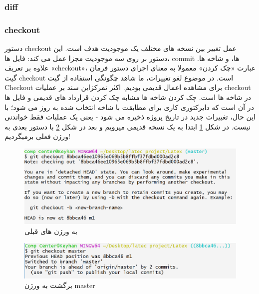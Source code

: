 \subsubsection{diff}
\subsubsection{checkout}
دستور checkout عمل تغییر بین نسخه های مختلف یک موجودیت هدف است. این دستور بر روی سه موجودیت مجزا عمل می کند: فایل ها، commit ها، و شاخه ها. علاوه بر تعریف «checkout»، عبارت «چک کردن» معمولا به معنای اجرای دستور فرمان گیت checkout است. در موضوع لغو تغییرات، ما شاهد چگونگی استفاده از گیت  Checkout برای مشاهده اعمال قدیمی بودیم. اکثر تمرکزاین سند بر عملیات checkout در شاخه ها است.
\newline
چک کردن شاخه ها مشابه چک کردن قرارداد های قدیمی و فایل ها در آن است که دایرکتوری کاری برای مطابقت با شاخه انتخاب شده به روز می شود؛ با این حال، تغییرات جدید در تاریخ پروژه ذخیره می شود - یعنی یک عملیات فقط خواندنی نیست. \newline
در شکل \ref{Fig:GitCheckout} ابتدا به یک نسخه قدیمی میرویم و بعد در شکل \ref{Fig:GitCheckout2} با دستور بعدی به ورژن فعلی برمیگردیم!
\newline
\begin{figure}[tbh]
	\centering
	\includegraphics[width=1\textwidth]{./Figures/GitCheckout}
	\caption{ به ورژن های قبلی}
	\label{Fig:GitCheckout}
\end{figure}
\begin{figure}[tbh]
	\centering
	\includegraphics[width=1\textwidth]{./Figures/GitCheckout2}
	\caption{ برگشت به ورژن master }
	\label{Fig:GitCheckout2}
\end{figure}
